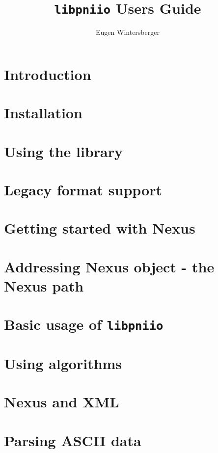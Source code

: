 \documentclass[a4paper,draft]{scrbook}
\title{{\Huge{\tt libpniio} Users Guide}}
\author{Eugen Wintersberger}
\newcommand{\libpniio}{\texttt{libpniio}}
\begin{document}
\maketitle
\tableofcontents
\listoftodos

\chapter{Introduction}\label{chapter:introduction}

\FloatBarrier

\chapter{Installation}\label{chapter:installation}

\FloatBarrier

\chapter{Using the library}\label{chapter:usage}

\FloatBarrier

\chapter{Legacy format support}\label{chapter:legacy_formats}

\FloatBarrier


\chapter{Getting started with Nexus}\label{chapter:nexus_quickstart}

\FloatBarrier

\chapter{Addressing Nexus object - the Nexus path}

\FloatBarrier

\chapter{Basic usage of \libpniio}

\FloatBarrier

\chapter{Using algorithms}
\FloatBarrier

\chapter{Nexus and XML}

\FloatBarrier

\appendix
\chapter{Parsing ASCII data}\label{appendix:parsers}

\FloatBarrier


%
\end{document}
